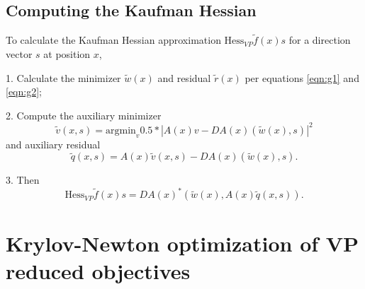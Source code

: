 \subsection{Computing the Kaufman Hessian}

To calculate the Kaufman Hessian approximation $\mbox{Hess}_{VP}\tilde{f}(x)s$ for a direction vector $s$ at position $x$,

1. Calculate the minimizer $\tilde{w}(x)$ and residual $\tilde{r}(x)$ per equations \ref{eqn:g1} and \ref{eqn:g2};

2. Compute the auxiliary minimizer
\begin{equation}
  \label{eqn:h1}
\tilde{v}(x,s) = \mbox{argmin}_v 0.5*|A(x)v-DA(x)(\tilde{w}(x),s)|^2
\end{equation}
and auxiliary residual
\begin{equation}
  \label{eqn:h2}
  \tilde{q}(x,s) = A(x)\tilde{v}(x,s) - DA(x)(\tilde{w}(x),s).
\end{equation}

3. Then
\begin{equation}
  \label{eqn:h3}
  \mbox{Hess}_{VP}\tilde{f}(x)s = DA(x)^*(\tilde{w}(x),A(x)\tilde{q}(x,s)).
\end{equation}

\section{Krylov-Newton optimization of VP reduced objectives}

